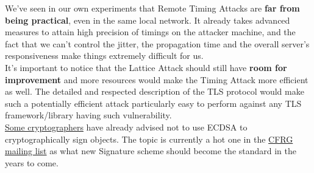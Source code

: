 \documentclass[a4paper,11pt]{article}
\begin{document}
We've seen in our own experiments that Remote Timing Attacks are \textbf{far from being practical}, even in the same local network. It already takes advanced measures to attain high precision of timings on the attacker machine, and the fact that we can't control the jitter, the propagation time and the overall server's responsiveness make things extremely difficult for us.\\

It's important to notice that the Lattice Attack should still have \textbf{room for improvement} and more resources would make the Timing Attack more efficient as well. The detailed and respected description of the TLS protocol would make such a potentially efficient attack particularly easy to perform against any TLS framework/library having such vulnerability.\\ \href{http://blog.cryptographyengineering.com/2012/03/surviving-bad-rng.html}{Some cryptographers} have already advised not to use ECDSA to cryptographically sign objects. The topic is currently a hot one in the \href{http://www.ietf.org/mail-archive/web/cfrg/current/maillist.html}{CFRG mailing list} as what new Signature scheme should become the standard in the years to come.

\newpage
\end{document}

